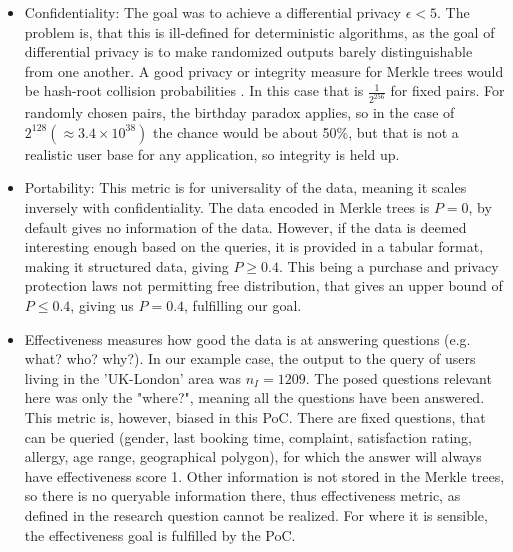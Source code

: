 \documentclass[english, 12pt, a4paper, sci, utf8, a-2b, online]{aaltothesis}
\theoremstyle{change}
\theoremstyle{theoremstyle}
\begin{document}
\begin{itemize}
    Which larger than one, making it fail our criteria. This would always be the case however, unless the buyer is looking for something that is true for a majority in the database. With an increasing number of Buyers this will not change, because if they are looking to match the same criteria, they are going to get the same score, if they are matching something different, the criteria changes and cannot be counted towards the previous ones. The accuracy measure for this case seems to have been poorly defined. The Buyer is interested in users data, who is matching a profile. Accuracy should be calculated on the Buyers own goals of the data, or the truthfulness of the data provided by the user. It is unrealistic for this thesis to measure cases e.g. "How many users has actually bought a product the Buyer company advertised them from the customers data we provided". That leaves the second option, having to confirm truthfulness of the data with the users. The data is pseudo-anonymised in a way that is losing minimal information, and there is a way for the Governor entity to confirm validity of the data with the user, but that is sadly out of the scope of this thesis.
    \item Confidentiality: The goal was to achieve a differential privacy $\epsilon < 5$. The problem is, that this is ill-defined for deterministic algorithms, as the goal of differential privacy is to make randomized outputs barely distinguishable from one another\cite{sharma2021differential}. A good privacy or integrity measure for Merkle trees would be hash-root collision probabilities \cite{kuznetsov2024merkle}. In this case that is $\frac{1}{2^{256}}$ for fixed pairs. For randomly chosen pairs, the birthday paradox applies, so in the case of $2^{128} (\approx 3.4 \times 10^{38})$ the chance would be about 50\%, but that is not a realistic user base for any application, so integrity is held up.
    \item Portability: This metric is for universality of the data, meaning it scales inversely with confidentiality. The data encoded in Merkle trees is $P=0$, by default gives no information of the data. However, if the data is deemed interesting enough based on the queries, it is provided in a tabular format, making it structured data, giving $P \geq 0.4$. This being a purchase and privacy protection laws not permitting free distribution, that gives an upper bound of $P\leq0.4$, giving us $P=0.4$, fulfilling our goal.
    \item Effectiveness measures how good the data is at answering questions (e.g. what? who? why?). In our example case, the output to the query of users living in the 'UK-London' area was $n_I=1209$. The posed questions relevant here was only the "where?", meaning all the questions have been answered. This metric is, however, biased in this PoC. There are fixed questions, that can be queried (gender, last booking time, complaint, satisfaction rating, allergy, age range, geographical polygon), for which the answer will always have effectiveness score 1. Other information is not stored in the Merkle trees, so there is no queryable information there, thus effectiveness metric, as defined in the research question cannot be realized. For where it is sensible, the effectiveness goal is fulfilled by the PoC.

\end{itemize}
\end{document}
